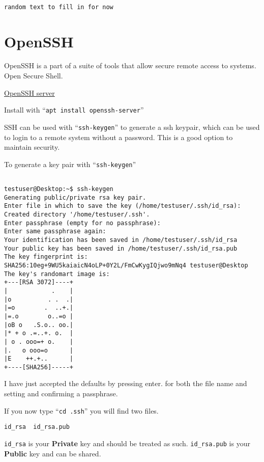\documentclass{extbook}
\begin{document}
\begin{verbatim}

random text to fill in for now

\end{verbatim}



\section{OpenSSH}

OpenSSH is a part of a suite of tools that allow secure remote access to systems. Open Secure Shell.

\href{https://www.openssh.com/}{OpenSSH server}

Install with ``\verb|apt install openssh-server|''

SSH can be used with ``\verb|ssh-keygen|'' to generate a ssh keypair, which can be used to login to a remote system without a password. This is a good option to maintain security.

To generate a key pair with ``\verb|ssh-keygen|''


\begin{verbatim}

testuser@Desktop:~$ ssh-keygen
Generating public/private rsa key pair.
Enter file in which to save the key (/home/testuser/.ssh/id_rsa):
Created directory '/home/testuser/.ssh'.
Enter passphrase (empty for no passphrase):
Enter same passphrase again:
Your identification has been saved in /home/testuser/.ssh/id_rsa
Your public key has been saved in /home/testuser/.ssh/id_rsa.pub
The key fingerprint is:
SHA256:10eg+9WU5kaiaicN4oLP+0Y2L/FmCwKygIQjwo9mNq4 testuser@Desktop
The key's randomart image is:
+---[RSA 3072]----+
|            .    |
|o          . .  .|
|=o        .  ..+.|
|=.o        o..=o |
|oB o   .S.o.. oo.|
|* + o .=..+. o.  |
| o . ooo=+ o.    |
|.   o ooo=o      |
|E    ++.+..      |
+----[SHA256]-----+

\end{verbatim}

I have just accepted the defaults by pressing enter. for both the file name and setting and confirming a passphrase.

If you now type ``\verb|cd .ssh|'' you will find two files.

\begin{verbatim}
id_rsa  id_rsa.pub
\end{verbatim}

\verb|id_rsa| is your \textbf{Private} key and should be treated as such. \verb|id_rsa.pub| is your \textbf{Public} key and can be shared.
\end{document}
